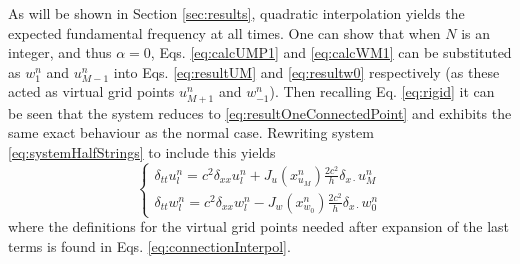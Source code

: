 As will be shown in Section \ref{sec:results}, quadratic interpolation yields the expected fundamental frequency at all times. One can show that when $N$ is an integer, and thus $\alpha = 0$, Eqs. \eqref{eq:calcUMP1} and \eqref{eq:calcWM1} can be substituted as $w_1^n$ and $u_{M-1}^n$ into Eqs. \eqref{eq:resultUM} and \eqref{eq:resultw0} respectively (as these acted as virtual grid points $u_{M+1}^n$ and $w_{-1}^n$). Then recalling Eq. \eqref{eq:rigid} it can be seen that the system reduces to \eqref{eq:resultOneConnectedPoint} and exhibits the same exact behaviour as the normal case. %
Rewriting system \eqref{eq:systemHalfStrings} to include this yields
\begin{equation}\label{eq:FDSwithMethod}
    \begin{cases}
        \delta_{tt}u_l^n = c^2\delta_{xx}u_l^n + J_u(x_{u_M}^n)\frac{2c^2}{h}\delta_{x\cdot}u_M^n\\
        \delta_{tt}w_l^n = c^2\delta_{xx}w_l^n - J_w(x_{w_0}^n)\frac{2c^2}{h}\delta_{x\cdot}w_0^n
    \end{cases}
\end{equation}
where the definitions for the virtual grid points needed after expansion of the last terms is found in Eqs. \eqref{eq:connectionInterpol}.
